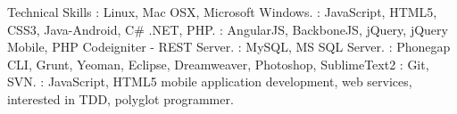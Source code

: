 \documentclass{resume}
\author{Rahmathullah M}
\begin{document}
\maketitle



\begin{category}{Technical Skills}
  : Linux, Mac OSX, Microsoft Windows.
  : JavaScript, HTML5, CSS3, Java-Android, C\# .NET, PHP.
  : AngularJS, BackboneJS, jQuery, jQuery Mobile, PHP Codeigniter - REST Server.
  : MySQL, MS SQL Server.
  : Phonegap CLI, Grunt, Yeoman, Eclipse, Dreamweaver, Photoshop, SublimeText2
  : Git, SVN.
  : JavaScript, HTML5 mobile application development, web services, interested in TDD, polyglot programmer.
\end{category}

\end{document}
